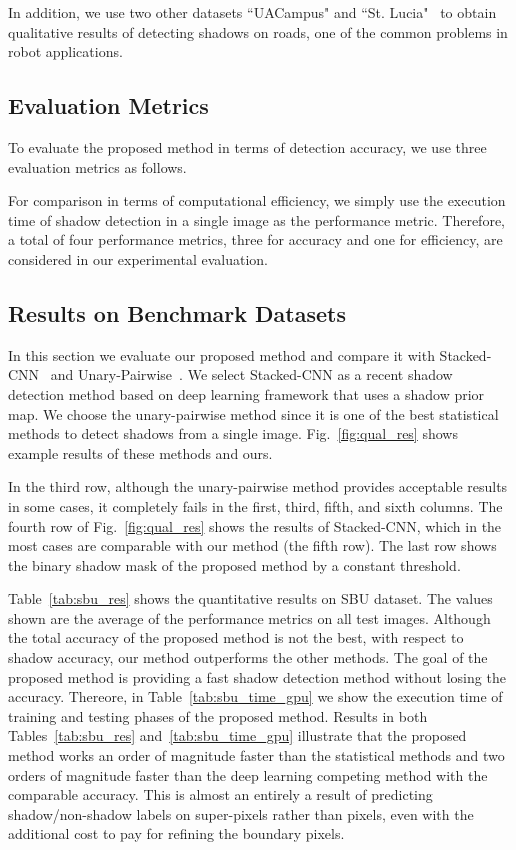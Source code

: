 \documentclass[letterpaper, 10 pt, conference]{ieeeconf}
\begin{document}
In addition, we use two other datasets ``UACampus" and ``St. Lucia"~\cite{Lucia} to obtain qualitative results of detecting shadows on roads, one of the common problems in robot applications.

\subsection{Evaluation Metrics}
\label{evaluation}
To evaluate the proposed method in terms of detection accuracy, we use three evaluation metrics as follows.




For comparison in terms of computational efficiency, we simply use the execution time of shadow detection in a single image as the performance metric. Therefore, a total of four performance metrics, three for accuracy and one for efficiency, are considered in our experimental evaluation.

\subsection{Results on Benchmark Datasets}
In this section we evaluate our proposed method and compare it with Stacked-CNN~\cite{Vicente2} and Unary-Pairwise~\cite{Gue}. We select Stacked-CNN as a recent shadow detection method based on deep learning framework that uses a shadow prior map. We choose the unary-pairwise method since it is one of the best statistical methods to detect shadows from a single image. Fig.~\ref{fig:qual_res} shows example results of these methods and ours. 

In the third row, although the unary-pairwise method provides acceptable results in some cases, it completely fails in the first, third, fifth, and sixth columns. The fourth row of Fig.~\ref{fig:qual_res} shows the results of Stacked-CNN, which in the most cases are comparable with our method (the fifth row). The last row shows the binary shadow mask of the proposed method by a constant threshold. 








Table~\ref{tab:sbu_res} shows the quantitative results on SBU dataset. The values shown are the average of the performance metrics on all test images. Although the total accuracy of the proposed method is not the best, with respect to shadow accuracy, our method outperforms the other methods. The goal of the proposed method is providing a fast shadow detection method without losing the accuracy. Thereore, in Table~\ref{tab:sbu_time_gpu} we show the execution time of training and testing phases of the proposed method. Results in both Tables~\ref{tab:sbu_res} and~\ref{tab:sbu_time_gpu} illustrate that the proposed method works an order of magnitude faster than the statistical methods and two orders of magnitude faster than the deep learning competing method with the comparable accuracy. This is almost an entirely a result of predicting shadow/non-shadow labels on super-pixels rather than pixels, even with the additional cost to pay for refining the boundary pixels.
\end{document}
